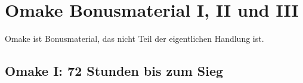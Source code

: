\chapter{Omake Bonusmaterial I, II und III\protect\footnotemark}

\begin{chapterOpeningAuthorNote}

Omake ist Bonusmaterial, das nicht Teil der eigentlichen Handlung ist.
\end{chapterOpeningAuthorNote}




\section{Omake I: 72 Stunden bis zum Sieg}

